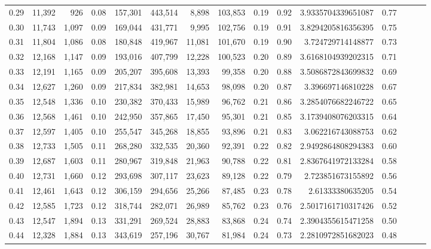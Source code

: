\begin{tabular}{rrrrrrrrrrrrrrr}
0.29 &  11,392 &    926 &  0.08 &  157,301 &  443,514 &    8,898 &  103,853 &  0.19 &  0.92 &     3.9335704339651087 &      0.77 \\
0.30 &  11,743 &  1,097 &  0.09 &  169,044 &  431,771 &    9,995 &  102,756 &  0.19 &  0.91 &     3.8294205816356395 &      0.75 \\
0.31 &  11,804 &  1,086 &  0.08 &  180,848 &  419,967 &   11,081 &  101,670 &  0.19 &  0.90 &      3.724729714148877 &      0.73 \\
0.32 &  12,168 &  1,147 &  0.09 &  193,016 &  407,799 &   12,228 &  100,523 &  0.20 &  0.89 &     3.6168104939202315 &      0.71 \\
0.33 &  12,191 &  1,165 &  0.09 &  205,207 &  395,608 &   13,393 &   99,358 &  0.20 &  0.88 &     3.5086872843699832 &      0.69 \\
0.34 &  12,627 &  1,260 &  0.09 &  217,834 &  382,981 &   14,653 &   98,098 &  0.20 &  0.87 &      3.396697146810228 &      0.67 \\
0.35 &  12,548 &  1,336 &  0.10 &  230,382 &  370,433 &   15,989 &   96,762 &  0.21 &  0.86 &     3.2854076682246722 &      0.65 \\
0.36 &  12,568 &  1,461 &  0.10 &  242,950 &  357,865 &   17,450 &   95,301 &  0.21 &  0.85 &     3.1739408076203315 &      0.64 \\
0.37 &  12,597 &  1,405 &  0.10 &  255,547 &  345,268 &   18,855 &   93,896 &  0.21 &  0.83 &      3.062216743088753 &      0.62 \\
0.38 &  12,733 &  1,505 &  0.11 &  268,280 &  332,535 &   20,360 &   92,391 &  0.22 &  0.82 &     2.9492864808294383 &      0.60 \\
0.39 &  12,687 &  1,603 &  0.11 &  280,967 &  319,848 &   21,963 &   90,788 &  0.22 &  0.81 &     2.8367641972133284 &      0.58 \\
0.40 &  12,731 &  1,660 &  0.12 &  293,698 &  307,117 &   23,623 &   89,128 &  0.22 &  0.79 &      2.723851673155892 &      0.56 \\
0.41 &  12,461 &  1,643 &  0.12 &  306,159 &  294,656 &   25,266 &   87,485 &  0.23 &  0.78 &       2.61333380635205 &      0.54 \\
0.42 &  12,585 &  1,723 &  0.12 &  318,744 &  282,071 &   26,989 &   85,762 &  0.23 &  0.76 &     2.5017161710317426 &      0.52 \\
0.43 &  12,547 &  1,894 &  0.13 &  331,291 &  269,524 &   28,883 &   83,868 &  0.24 &  0.74 &     2.3904355615471258 &      0.50 \\
0.44 &  12,328 &  1,884 &  0.13 &  343,619 &  257,196 &   30,767 &   81,984 &  0.24 &  0.73 &     2.2810972851682023 &      0.48 \\

\end{tabular}
